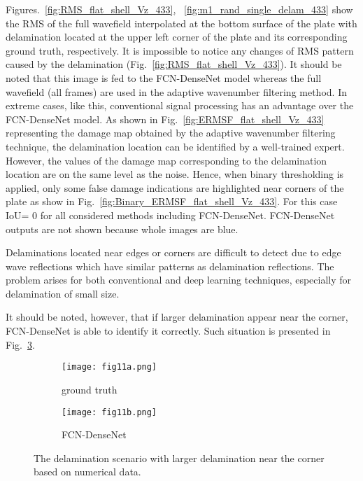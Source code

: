 Figures.~\ref{fig:RMS_flat_shell_Vz_433}, ~\ref{fig:m1_rand_single_delam_433} show the RMS of the full wavefield interpolated at the bottom surface of the plate with delamination located at the upper left corner of the plate and its corresponding ground truth, respectively.
It is impossible to notice any changes of RMS pattern caused by the delamination (Fig.~\ref{fig:RMS_flat_shell_Vz_433}).
It should be noted that this image is fed to the FCN-DenseNet model whereas the full wavefield (all frames) are used in the adaptive wavenumber filtering method.
In extreme cases, like this, conventional signal processing has an advantage over the FCN-DenseNet model.
As shown in Fig.~\ref{fig:ERMSF_flat_shell_Vz_433} representing the damage map obtained by the adaptive wavenumber filtering technique, the delamination location can be identified by a well-trained expert. 
However, the values of the damage map corresponding to the delamination location are on the same level as the noise.
Hence, when binary thresholding is applied, only some false damage indications are highlighted near corners of the plate as show in Fig.~\ref{fig:Binary_ERMSF_flat_shell_Vz_433}. 
For this case IoU= \(0\) for all considered methods including FCN-DenseNet.
FCN-DenseNet outputs are not shown because whole images are blue.
 
Delaminations located near edges or corners are difficult to detect due to edge wave reflections which have similar patterns as delamination reflections. 
The problem arises for both conventional and deep learning techniques, especially for delamination of small size. 

It should be noted, however, that if larger delamination appear near the corner, FCN-DenseNet is able to identify it correctly.
Such situation is presented in Fig.~\ref{fig:corner_delam}.	

\begin{figure}[!h]
	\centering
	\begin{subfigure}[b]{0.47\textwidth}
		\centering
		\texttt{[image: fig11a.png]}
		\caption{ground truth}
		\label{fig:GT_385}
	\end{subfigure}
	\hfill
	\begin{subfigure}[b]{0.47\textwidth}
		\centering
		\texttt{[image: fig11b.png]}
		\caption{FCN-DenseNet}
		\label{fig:FCN-DenseNet_385}
	\end{subfigure}
	\caption{The delamination scenario with larger delamination near the corner based on numerical data.}
	\label{fig:corner_delam}
\end{figure} 

